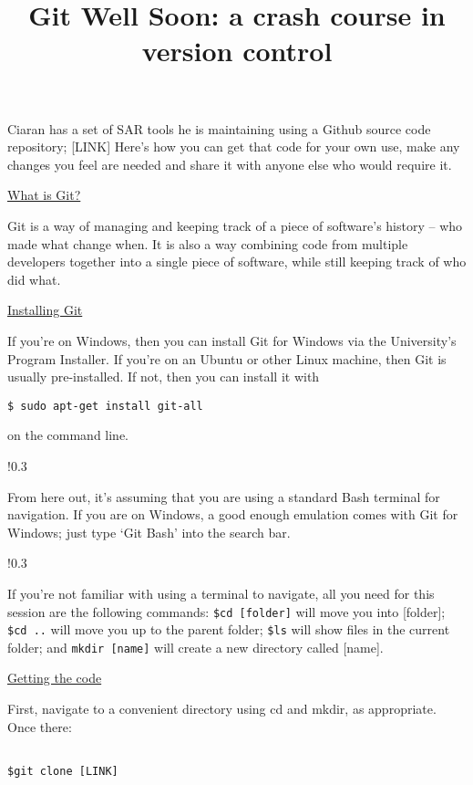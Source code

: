 \documentclass[11pt, a4paper, english]{article}
\newenvironment{wrapbox}
	{
		\begin{wrapfigure}{!}{0.3\textwidth}
		\begin{tcolorbox}
	}
	{
		\end{tcolorbox}
		\end{wrapfigure}
	}
\begin{document}
\title{Git Well Soon: a crash course in version control}

\maketitle

Ciaran has a set of SAR tools he is maintaining using a Github source code repository; [LINK] Here’s how you can get that code for your own use, make any changes you feel are needed and share it with anyone else who would require it.

\underline{What is Git?}

Git is a way of managing and keeping track of a piece of software’s history – who made what change when. It is also a way combining code from multiple developers together into a single piece of software, while still keeping track of who did what.

\underline{Installing Git}

If you're on Windows, then you can install Git for Windows via the University’s Program Installer. If you're on an Ubuntu or other Linux machine, then Git is usually pre-installed. If not, then you can install it with

\begin{verbatim}
$ sudo apt-get install git-all
\end{verbatim}

on the command line.

\begin{wrapbox}
From here out, it’s assuming that you are using a standard Bash terminal for navigation. If you are on Windows, a good enough emulation comes with Git for Windows; just type ‘Git Bash’ into the search bar.
\end{wrapbox}

\begin{wrapbox}
If you’re not familiar with using a terminal to navigate, all you need for this session are the following commands: \verb|$cd [folder]| will move you into [folder]; \verb|$cd ..| will move you up to the parent folder; \verb|$ls| will show files in the current folder; and \verb|mkdir [name]| will create a new directory called [name].
\end{wrapbox}

\underline{Getting the code}

First, navigate to a convenient directory using cd and mkdir, as appropriate. Once there:

\begin{verbatim}

$git clone [LINK]

\end{verbatim}
\end{document}
